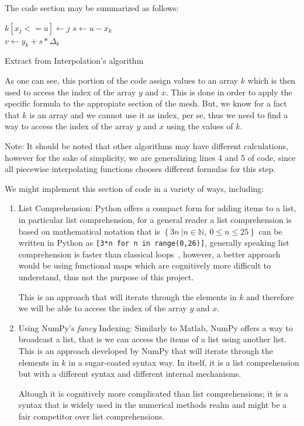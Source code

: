 The code section may be summarized as follows: 


\begin{algorithm}[H]
\SetAlgoLined
{} {
$k[x_j <= u] \gets j$
}
$s \gets u - x_k$\\
$v \gets y_k + s * \Delta_k$

\caption{Extract from Interpolation's algorithm}
\end{algorithm}
As one can see, this portion of the code assign values to an array $k$ which is then used to access the index of the array $y$ and $x$. This is done in order to apply the specific formula to the appropiate section of the mesh. But, we know for a fact that $k$ is an array and we cannot use it as index, per se, thus we need to find a way to access the index of the array $y$ and $x$ using the values of $k$.

Note: It should be noted that other algorithms may have different calculations, however for the sake of simplicity, we are generalizing lines 4 and 5  of code, since all piecewise interpolating functions chooses different formulas for this step.



We might implement this section of code in a variety of ways, including:
\begin{enumerate}
    \item List Comprehension: Python offers a compact form for adding items to a list, in particular list comprehension, for a general reader a list comprehension is based on mathematical notation that is $\left\{ 3n\ | n\in \mathbb{N},\ 0\leq n\leq 25\right\}$ can be written in Python as \lstinline|[3*n for n in range(0,26)]|, generally speaking list comprehension is faster than classical loops~\cite{PythonSpeedPerformanceTips}, however, a better approach would be using functional maps which are cognitively more difficult to understand, thus not the purpose of this project.
    
    This is an approach that will iterate through the elements in $k$ and therefore we will be able to access the index of the array $y$ and $x$.

    \item Using NumPy's \textit{fancy} Indexing: Similarly to Matlab, NumPy offers a way to broadcast a list, that is we can access the items of a list using another list. This is an approach developed by NumPy that will iterate through the elements in $k$ in a sugar-coated syntax way. In itself, it is a list comprehension but with a different syntax and different internal mechanisms.
    
    Altough it is cognitively more complicated than list comprehensions; it is a syntax that is widely used in the numerical methods realm and might be a fair competitor over list comprehensions.
    
    
    
\end{enumerate}
